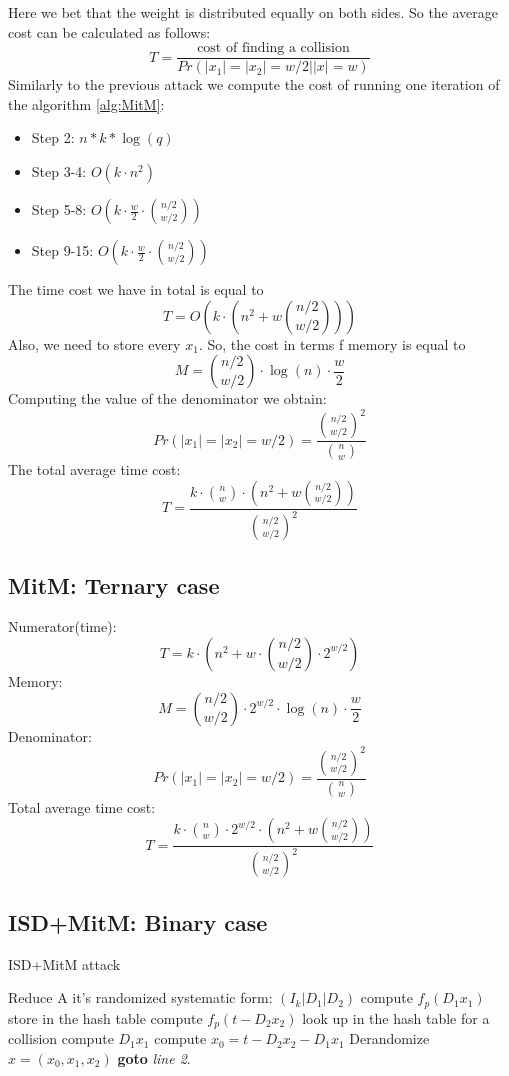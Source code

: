 \documentclass[12pt]{article}
\begin{document}
Here we bet that the weight is distributed equally on both sides. So the average cost can be calculated as follows:
\[
  T = \frac{\text{cost of finding a collision}}{Pr(|x_1| = |x_2| = w/2| |x| =w)}
\]
Similarly to the previous attack we compute the cost of running one iteration of the algorithm \ref{alg:MitM}:
\begin{itemize}
    \item Step 2: $n*k*\log(q)$
    \item Step 3-4: $O(k \cdot n^2)$
    \item Step 5-8: $O(k \cdot \frac{w}{2} \cdot \binom{n/2}{w/2})$
    \item Step 9-15: $O(k \cdot \frac{w}{2} \cdot \binom{n/2}{w/2})$
\end{itemize}

The time cost we have in total is equal to
\[
T = O(k \cdot (n^2 + w\binom{n/2}{w/2}))
\]
Also, we need to store every $x_1$. So, the cost in terms f memory is equal to
\[
M = \binom{n/2}{w/2} \cdot \log(n) \cdot \frac{w}{2}
\]
Computing the value of the denominator we obtain:
\[
Pr(|x_1| = |x_2| = w/2) = \frac{\binom{n/2}{w/2}^{2}}{\binom{n}{w}}
\]
The total average time cost:
\[
  T = \frac{k \cdot \binom{n}{w} \cdot (n^2 + w\binom{n/2}{w/2})}{\binom{n/2}{w/2}^2}
\]

\subsection{MitM: Ternary case}
Numerator(time):
\[
T = k \cdot (n^2 + w \cdot \binom{n/2}{w/2} \cdot 2^{w/2})
\]
Memory:
\[
M = \binom{n/2}{w/2} \cdot 2^{w/2} \cdot \log(n) \cdot \frac{w}{2}
\]
Denominator:
\[
Pr(|x_1| = |x_2| = w/2) = \frac{\binom{n/2}{w/2}^{2}}{\binom{n}{w}}
\]
Total average time cost:
\[
  T = \frac{k \cdot \binom{n}{w} \cdot 2^{w/2} \cdot (n^2 + w\binom{n/2}{w/2})}{\binom{n/2}{w/2}^2}
\]

\subsection{ISD+MitM: Binary case}

\begin{algorithm}
\caption{ISD+MitM attack}\label{alg:ISD+MitM}
\begin{algorithmic}[1]
    \State Reduce A it's randomized systematic form: $(I_k |D_1|D_2)$
    \State compute $f_{p}(D_1x_1)$
    \State store in the hash table
    \EndFor
    \State compute $f_{p}(t - D_2x_2)$
    \State look up in the hash table for a collision
        \State compute $D_1x_1$
        \State compute $x_0 = t - D_2x_2 - D_1x_1$
        \State \Return Derandomize $x = (x_0, x_1, x_2)$
        \EndIf
    \EndIf
    \EndFor
\State \textbf{goto} \emph{line 2}.
\EndProcedure
\end{algorithmic}
\end{algorithm}
\end{document}

